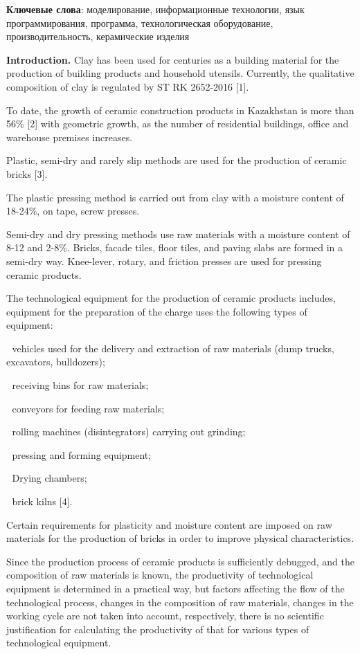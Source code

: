 {\bfseries Ключевые слова}: моделирование, информационные технологии, язык
программирования, программа, технологическая оборудование,
производительность, керамические изделия

{\bfseries Introduction.} Clay has been used for centuries as a building
material for the production of building products and household utensils.
Currently, the qualitative composition of clay is regulated by ST RK
2652-2016 {[}1{]}.

To date, the growth of ceramic construction products in Kazakhstan is
more than 56\% {[}2{]} with geometric growth, as the number of
residential buildings, office and warehouse premises increases.

Plastic, semi-dry and rarely slip methods are used for the production of
ceramic bricks {[}3{]}.

The plastic pressing method is carried out from clay with a moisture
content of 18-24\%, on tape, screw presses.

Semi-dry and dry pressing methods use raw materials with a moisture
content of 8-12 and 2-8\%. Bricks, facade tiles, floor tiles, and paving
slabs are formed in a semi-dry way. Knee-lever, rotary, and friction
presses are used for pressing ceramic products.

The technological equipment for the production of ceramic products
includes, equipment for the preparation of the charge uses the following
types of equipment:

 vehicles used for the delivery and extraction of raw materials (dump
trucks, excavators, bulldozers);

 receiving bins for raw materials;

 conveyors for feeding raw materials;

{\bfseries } rolling machines (disintegrators) carrying out grinding;

 pressing and forming equipment;

 Drying chambers;

 brick kilns {[}4{]}.

Certain requirements for plasticity and moisture content are imposed on
raw materials for the production of bricks in order to improve physical
characteristics.

Since the production process of ceramic products is sufficiently
debugged, and the composition of raw materials is known, the
productivity of technological equipment is determined in a practical
way, but factors affecting the flow of the technological process,
changes in the composition of raw materials, changes in the working
cycle are not taken into account, respectively, there is no scientific
justification for calculating the productivity of that for various types
of technological equipment.

